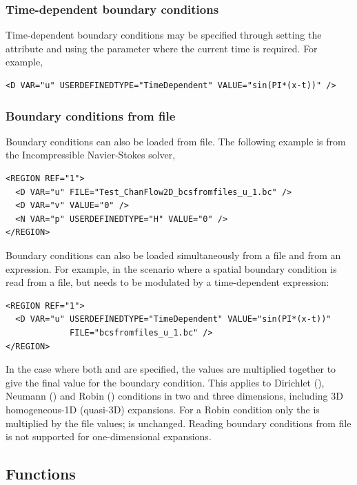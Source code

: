 \subsubsection{Time-dependent boundary conditions}
Time-dependent boundary conditions may be specified through setting the
 attribute and using the parameter  where the
current time is required. For example,
\begin{lstlisting}[style=XMLStyle]
<D VAR="u" USERDEFINEDTYPE="TimeDependent" VALUE="sin(PI*(x-t))" />
\end{lstlisting}

\subsubsection{Boundary conditions from file}
Boundary conditions can also be loaded from file. The following example is from
the Incompressible Navier-Stokes solver,
\begin{lstlisting}[style=XMLStyle]
<REGION REF="1">
  <D VAR="u" FILE="Test_ChanFlow2D_bcsfromfiles_u_1.bc" />
  <D VAR="v" VALUE="0" />
  <N VAR="p" USERDEFINEDTYPE="H" VALUE="0" />
</REGION>
\end{lstlisting}

Boundary conditions can also be loaded simultaneously from a file and from an
expression. For example, in the scenario where a spatial boundary
condition is read from a file, but needs to be modulated by a time-dependent 
expression:
\begin{lstlisting}[style=XMLStyle]
<REGION REF="1">
  <D VAR="u" USERDEFINEDTYPE="TimeDependent" VALUE="sin(PI*(x-t))"
             FILE="bcsfromfiles_u_1.bc" />
</REGION>
\end{lstlisting}

In the case where both  and  are specified, the values
are multiplied together to give the final value for the boundary condition.
This applies to Dirichlet (), Neumann () and Robin
() conditions in two and three dimensions, including 3D
homogeneous-1D (quasi-3D) expansions. For a Robin condition only the
 is multiplied by the file values;  is unchanged.
Reading boundary conditions from file is not supported for one-dimensional
expansions.

\subsection{Functions}

